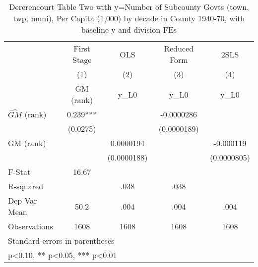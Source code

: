 \begin{table}[htbp]\centering
\def\sym#1{\ifmmode^{#1}\else\(^{#1}\)\fi}
\caption{Dererencourt Table Two with y=Number of Subcounty Govts (town, twp, muni), Per Capita (1,000) by decade in County 1940-70, with baseline y and division FEs}
\begin{tabular}{l*{4}{c}}
\toprule
                    & First Stage   &         OLS   &Reduced Form   &        2SLS   \\
                    &\multicolumn{1}{c}{(1)}&\multicolumn{1}{c}{(2)}&\multicolumn{1}{c}{(3)}&\multicolumn{1}{c}{(4)}\\
                    &\multicolumn{1}{c}{GM  (rank)}&\multicolumn{1}{c}{y\_L0}&\multicolumn{1}{c}{y\_L0}&\multicolumn{1}{c}{y\_L0}\\
\midrule
$\hat{GM}$ (rank)   &       0.239***&               &  -0.0000286   &               \\
                    &    (0.0275)   &               & (0.0000189)   &               \\
\addlinespace
GM  (rank)          &               &   0.0000194   &               &   -0.000119   \\
                    &               & (0.0000188)   &               & (0.0000805)   \\
\midrule
F-Stat              &       16.67   &               &               &               \\
R-squared           &               &        .038   &        .038   &               \\
Dep Var Mean        &        50.2   &        .004   &        .004   &        .004   \\
Observations        &        1608   &        1608   &        1608   &        1608   \\
\bottomrule
\multicolumn{5}{l}{\footnotesize Standard errors in parentheses}\\
\multicolumn{5}{l}{\footnotesize * p<0.10, ** p<0.05, *** p<0.01}\\
\end{tabular}
\end{table}
